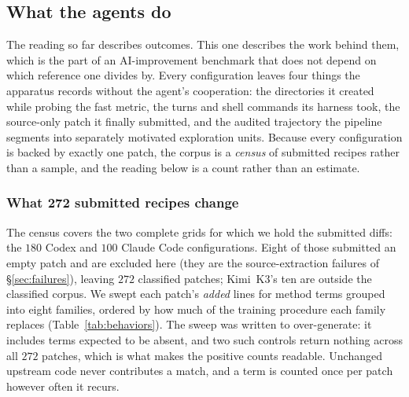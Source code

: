 \subsection{What the agents do}
\label{sec:behavior}

The reading so far describes outcomes. This one describes the work behind them, which is the part of
an AI-improvement benchmark that does not depend on which reference one divides by. Every
configuration leaves four things the apparatus records without the agent's cooperation: the directories it created while probing the fast metric, the
turns and shell commands its harness took, the source-only patch it finally submitted, and the audited
trajectory the pipeline segments into separately motivated exploration units. Because every configuration is backed by exactly one patch,
the corpus is a \emph{census} of submitted recipes rather than a sample, and the reading below is a
count rather than an estimate.

\subsubsection{What 272 submitted recipes change}
\label{sec:patches}

The census covers the two complete grids for which we hold the submitted diffs: the $180$ Codex and
$100$ Claude Code configurations. Eight of those submitted an empty patch and are excluded here (they
are the source-extraction failures of \S\ref{sec:failures}), leaving $272$ classified patches; Kimi~K3's
ten are outside the classified corpus. We swept each patch's \emph{added} lines for method terms
grouped into eight families, ordered by how much of the training procedure each family replaces
(Table~\ref{tab:behaviors}). The sweep was written to over-generate: it includes terms expected to be
absent, and two such controls return nothing across all $272$ patches, which is what makes the
positive counts readable. Unchanged upstream code never contributes a match, and a term is counted
once per patch however often it recurs.

